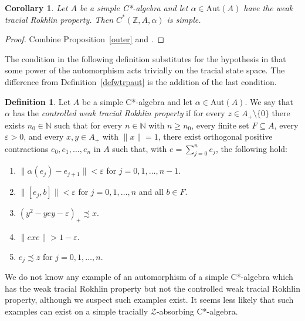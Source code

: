 \documentclass[11pt]{amsart}
\theoremstyle{plain}
\newtheorem{corollary}[theorem]{Corollary}
\theoremstyle{definition}
\newtheorem{definition}[theorem]{Definition}
\theoremstyle{remark}
\numberwithin{equation}{section}
\begin{document}
\begin{corollary}\label{C_8613_CrPrdSimple}
Let $A$ be a simple C*-algebra
and let $\alpha \in \mathrm{Aut} (A)$
have the weak tracial Rokhlin property.
Then $C^{*} (\mathbb{Z}, A, \alpha)$ is simple.
\end{corollary}

\begin{proof}
Combine Proposition~\ref{outer}
and \cite[Theorem~3.1]{Ki81}.
\end{proof}

The condition in the following definition substitutes for
the hypothesis in \cite[Lemma 6.6 and Theorem 6.7]{HO13}
that some power of the automorphism acts trivially
on the tracial state space.
The difference from Definition~\ref{defwtrpaut}
is the addition of the last condition.

\begin{definition}\label{defwtrpaut_cont}
Let $A$ be a simple C*-algebra and let $\alpha \in \mathrm{Aut} (A)$.
We say that $\alpha$ has
the \emph{controlled weak tracial Rokhlin property}
if for every $z \in A_{+} \setminus \{ 0 \}$
there exists $n_{0} \in \mathbb{N}$ such that
for every $n \in \mathbb{N}$ with $n \geq n_{0}$,
every finite set $F \subseteq A$, every $\varepsilon > 0$,
and every $x, y  \in A_{+}$ with $\| x \| = 1$,
there exist orthogonal positive contractions
$e_{0}, e_{1}, \ldots, e_{n}$ in $A$ such that,
with $e = \sum_{j = 0}^{n} e_{j}$, the following hold:
%
\begin{enumerate}
\item\label{defwtrpautc_it1}
$\| \alpha (e_{j}) - e_{j + 1} \| < \varepsilon$
for $j = 0, 1, \ldots, n - 1$.
\item\label{defwtrpautc_it2}
$\| [e_{j}, b] \| < \varepsilon$
for $j = 0, 1, \ldots, n$ and all $b \in F$.
\item\label{defwtrpautc_it3}
$(y^{2} - y e y - \varepsilon)_{+} \precsim x$.
\item\label{defwtrpautc_it4}
$\|e x e\| > 1 - \varepsilon$.
\item\label{defwtrpautc_it5}
$e_{j} \precsim z$ for $j = 0, 1, \ldots, n$.
\end{enumerate}
%
\end{definition}

We do not know any example
of an automorphism of a simple C*-algebra which has
the weak tracial Rokhlin property
but not the controlled weak tracial Rokhlin property,
although we suspect such examples exist.
It seems less likely
that such examples can exist
on a simple tracially $\mathcal{Z}$-absorbing C*-algebra.
\end{document}
